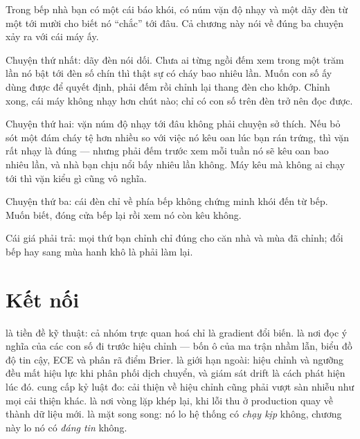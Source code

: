 \documentclass[../../deep_learning.tex]{subfiles}
\begin{document}
\begin{dongian}
Trong bếp nhà bạn có một cái báo khói, có núm vặn độ nhạy và một dãy đèn từ một tới mười cho biết nó ``chắc'' tới đâu. Cả chương này nói về đúng ba chuyện xảy ra với cái máy ấy.

Chuyện thứ nhất: dãy đèn nói dối. Chưa ai từng ngồi đếm xem trong một trăm lần nó bật tới đèn số chín thì thật sự có cháy bao nhiêu lần. Muốn con số ấy dùng được để quyết định, phải đếm rồi chỉnh lại thang đèn cho khớp. Chỉnh xong, cái máy không nhạy hơn chút nào; chỉ có con số trên đèn trở nên đọc được.

Chuyện thứ hai: vặn núm độ nhạy tới đâu không phải chuyện sở thích. Nếu bỏ sót một đám cháy tệ hơn nhiều so với việc nó kêu oan lúc bạn rán trứng, thì vặn rất nhạy là đúng --- nhưng phải đếm trước xem mỗi tuần nó sẽ kêu oan bao nhiêu lần, và nhà bạn chịu nổi bấy nhiêu lần không. Máy kêu mà không ai chạy tới thì vặn kiểu gì cũng vô nghĩa.

Chuyện thứ ba: cái đèn chỉ về phía bếp không chứng minh khói đến từ bếp. Muốn biết, đóng cửa bếp lại rồi xem nó còn kêu không.

Cái giá phải trả: mọi thứ bạn chỉnh chỉ đúng cho căn nhà và mùa đã chỉnh; đổi bếp hay sang mùa hanh khô là phải làm lại.

\end{dongian}

\section{Kết nối}
 là tiền đề kỹ thuật: cả nhóm trực quan hoá chỉ là gradient đổi biến.  là nơi đọc ý nghĩa của các con số đi trước hiệu chỉnh --- bốn ô của ma trận nhầm lẫn, biểu đồ độ tin cậy, ECE và phân rã điểm Brier.  là giới hạn ngoài: hiệu chỉnh và ngưỡng đều mất hiệu lực khi phân phối dịch chuyển, và giám sát drift là cách phát hiện lúc đó.  cung cấp kỷ luật đo: cải thiện về hiệu chỉnh cũng phải vượt sàn nhiễu như mọi cải thiện khác.  là nơi vòng lặp khép lại, khi lỗi thu ở production quay về thành dữ liệu mới.  là mặt song song: nó lo hệ thống có \emph{chạy kịp} không, chương này lo nó có \emph{đáng tin} không.
\end{document}
